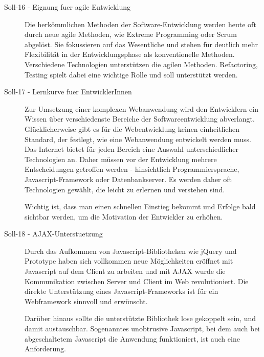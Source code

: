 \begin{description}
    \item[Soll-16 - Eignung fuer agile Entwicklung\label{itm:Soll-16}]

    Die herkömmlichen Methoden der Software-Entwicklung werden heute oft durch
    neue agile Methoden, wie Extreme Programming oder Scrum abgelöst. Sie
    fokussieren auf das Wesentliche und stehen für deutlich mehr Flexibilität in
    der Entwicklungsphase als konventionelle Methoden. Verschiedene Technologien
    unterstützen die agilen Methoden. Refactoring, Testing spielt dabei eine
    wichtige Rolle und soll unterstützt werden.

    \item[Soll-17 - Lernkurve fuer EntwicklerInnen\label{itm:Soll-17}]

    Zur Umsetzung einer komplexen Webanwendung wird den Entwicklern ein Wissen
    über verschiedenste Bereiche der Softwareentwicklung abverlangt.
    Glücklicherweise gibt es für die Webentwicklung keinen einheitlichen
    Standard, der festlegt, wie eine Webanwendung entwickelt werden muss. Das
    Internet bietet für jeden Bereich eine Auswahl unterschiedlicher
    Technologien an. Daher müssen vor der Entwicklung mehrere Entscheidungen
    getroffen werden - hinsichtlich Programmiersprache, Javascript-Framework
    oder Datenbankserver. Es werden daher oft Technologien gewählt, die leicht
    zu erlernen und verstehen sind.

    Wichtig ist, dass man einen schnellen Einstieg bekommt und Erfolge bald
    sichtbar werden, um die Motivation der Entwickler zu erhöhen.

    \item[Soll-18 - AJAX-Unterstuetzung\label{itm:Soll-18}]

    Durch das Aufkommen von Javascript-Bibliotheken wie jQuery und Prototype
    haben sich vollkommen neue Möglichkeiten eröffnet mit Javascript auf dem
    Client zu arbeiten und mit AJAX wurde die Kommunikation zwischen Server und
    Client im Web revolutioniert. Die direkte Unterstützung eines
    Javascript-Frameworks ist für ein Webframework sinnvoll und erwünscht.

    Darüber hinaus sollte die unterstützte Bibliothek lose gekoppelt sein, und
    damit austauschbar. Sogenanntes unobtrusive Javascript, bei dem auch bei
    abgeschaltetem Javascript die Anwendung funktioniert, ist auch eine Anforderung.
  \end{description}